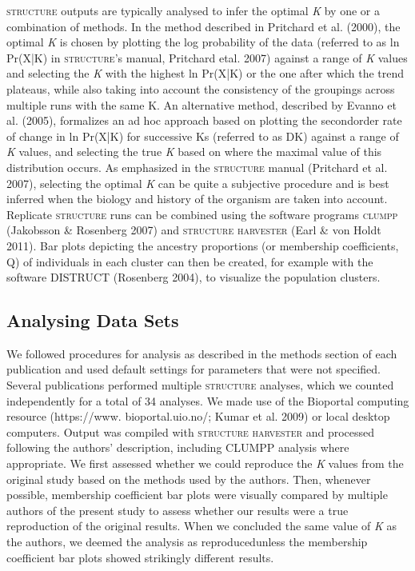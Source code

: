 \textsc{structure} outputs are typically analysed to infer the optimal \emph{K} by one or a combination of methods. In the method described in Pritchard et al. (2000), the optimal \emph{K} is chosen by plotting the log probability of the data (referred to as ln Pr(X|K) in \textsc{structure}’s manual, Pritchard etal. 2007) against a range of \emph{K} values and selecting the \emph{K} with the highest ln Pr(X|K) or the one after which the trend plateaus, while also taking into account the consistency of the groupings across multiple runs with the same K. An alternative method, described by Evanno et al. (2005), formalizes an ad hoc approach based on plotting the secondorder rate of change in ln Pr(X|K) for successive Ks (referred to as DK) against a range of \emph{K} values, and selecting the true \emph{K} based on where the maximal value of this distribution occurs. As emphasized in the \textsc{structure} manual (Pritchard et al. 2007), selecting the optimal \emph{K} can be quite a subjective procedure and is best inferred when the biology and history of the organism are taken into account. Replicate \textsc{structure} runs can be combined using the software programs \textsc{clumpp} (Jakobsson \& Rosenberg 2007) and \textsc{structure harvester} (Earl \& von Holdt 2011). Bar plots depicting the ancestry proportions (or membership coefficients, Q) of individuals in each cluster can then be created, for example with the software DISTRUCT (Rosenberg 2004), to visualize the population clusters.

\subsection{Analysing Data Sets}
We followed procedures for analysis as described in the methods section of each publication and used default settings for parameters that were not specified. Several publications performed multiple \textsc{structure} analyses, which we counted independently for a total of 34 analyses. We made use of the Bioportal computing resource (https://www. bioportal.uio.no/; Kumar et al. 2009) or local desktop computers. Output was compiled with \textsc{structure harvester} and processed following the authors’ description, including CLUMPP analysis where appropriate. We first assessed whether we could reproduce the \emph{K} values from the original study based on the methods used by the authors. Then, whenever possible, membership coefficient bar plots were visually compared by multiple authors of the present study to assess whether our results were a true reproduction of the original results. When we concluded the same value of \emph{K} as the authors, we deemed the analysis as reproducedunless the membership coefficient bar plots showed strikingly different results.

